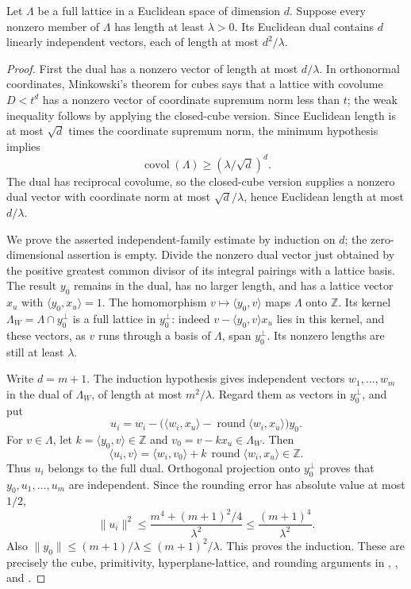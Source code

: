 \begin{srlemma}
\label{lem:ftb-euclidean-transference}
Let \(\Lambda\) be a full lattice in a Euclidean space of dimension
\(d\).  Suppose every nonzero member of \(\Lambda\) has length at least
\(\lambda>0\).  Its Euclidean dual contains \(d\) linearly independent
vectors, each of length at most \(d^2/\lambda\).
\end{srlemma}
\begin{proof}
First the dual has a nonzero vector of length at most \(d/\lambda\).
In orthonormal coordinates, Minkowski's theorem for cubes says that a
lattice with covolume \(D<t^d\) has a nonzero vector of coordinate
supremum norm less than \(t\); the weak inequality follows by applying
the closed-cube version.  Since Euclidean length is at most
\(\sqrt d\) times the coordinate supremum norm, the minimum hypothesis
implies
\[
 \operatorname{covol}(\Lambda)\ge(\lambda/\sqrt d)^d.
\]
The dual has reciprocal covolume, so the closed-cube version supplies a
nonzero dual vector with coordinate norm at most \(\sqrt d/\lambda\),
hence Euclidean length at most \(d/\lambda\).

We prove the asserted independent-family estimate by induction on
\(d\); the zero-dimensional assertion is empty.  Divide the nonzero
dual vector just obtained by the positive greatest common divisor of
its integral pairings with a lattice basis.  The result \(y_0\) remains
in the dual, has no larger length, and has a lattice vector \(x_u\)
with \(\langle y_0,x_u\rangle=1\).
The homomorphism \(v\mapsto\langle y_0,v\rangle\) maps \(\Lambda\) onto
\(\mathbb Z\).  Its kernel
\(\Lambda_W=\Lambda\cap y_0^\perp\) is a full lattice in \(y_0^\perp\):
indeed \(v-\langle y_0,v\rangle x_u\) lies in this kernel, and these
vectors, as \(v\) runs through a basis of \(\Lambda\), span
\(y_0^\perp\).  Its nonzero lengths are still at least \(\lambda\).

Write \(d=m+1\).  The induction hypothesis gives independent vectors
\(w_1,\ldots,w_m\) in the dual of \(\Lambda_W\), of length at most
\(m^2/\lambda\).  Regard them as vectors in \(y_0^\perp\), and put
\[
 u_i=w_i-
  \bigl(\langle w_i,x_u\rangle-
             \operatorname{round}\langle w_i,x_u\rangle\bigr)y_0 .
\]
For \(v\in\Lambda\), let \(k=\langle y_0,v\rangle\in\mathbb Z\) and
\(v_0=v-kx_u\in\Lambda_W\).  Then
\[
 \langle u_i,v\rangle
 =\langle w_i,v_0\rangle+
           k\,\operatorname{round}\langle w_i,x_u\rangle\in\mathbb Z.
\]
Thus \(u_i\) belongs to the full dual.  Orthogonal projection onto
\(y_0^\perp\) proves that \(y_0,u_1,\ldots,u_m\) are independent.
Since the rounding error has absolute value at most \(1/2\),
\[
 \|u_i\|^2
 \le \frac{m^4+(m+1)^2/4}{\lambda^2}
 \le \frac{(m+1)^4}{\lambda^2}.
\]
Also \(\|y_0\|\le(m+1)/\lambda\le(m+1)^2/\lambda\).
This proves the induction.  These are precisely the cube,
primitivity, hyperplane-lattice, and rounding arguments in
, , and
.
\end{proof}

